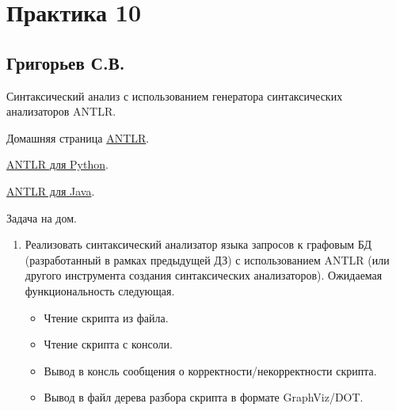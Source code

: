 \section{Практика 10}

\subsection{Григорьев С.В.}


Синтаксический анализ с использованием генератора синтаксических анализаторов ANTLR.

Домашняя страница \href{https://www.antlr.org/index.html}{ANTLR}.

\href{https://github.com/antlr/antlr4/blob/master/doc/python-target.md}{ANTLR для Python}.


\href{https://github.com/antlr/antlr4/blob/master/doc/java-target.md}{ANTLR для Java}.


Задача на дом.
\begin{enumerate}
  \item Реализовать синтаксический анализатор языка запросов к графовым БД (разработанный в рамках предыдущей ДЗ) с использованием ANTLR (или другого инструмента создания синтаксических анализаторов). Ожидаемая функциональность следующая. 
  \begin{itemize}
  \item Чтение скрипта из файла.
  \item Чтение скрипта с консоли.
  \item Вывод в консль сообщения о корректности/некорректности скрипта.
  \item Вывод в файл дерева разбора скрипта в формате GraphViz/DOT.
  \end{itemize}
\end{enumerate}